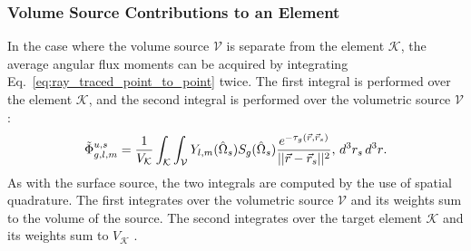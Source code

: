 \subsubsection{Volume Source Contributions to an Element}

In the case where the volume source $\mathcal{V}$ is separate from the element $\mathcal{K}$, the average angular flux moments can be acquired by integrating Eq.~\ref{eq:ray_traced_point_to_point} twice. The first integral is performed over the element $\mathcal{K}$, and the second integral is performed over the volumetric source $\mathcal{V}$:
\begin{equation}\label{eq:volume_to_element_not_same}
    \Tilde{\Phi}_{g,l,m}^{u, s} = \frac{1}{V_{\mathcal{K}}}\int_{\mathcal{K}} \int_{\mathcal{V}} Y_{l,m}(\hat{\Omega}_{s})S_{g}(\hat{\Omega}_{s})\frac{e^{-\tau_{g}(\vec{r}, \vec{r}_{s})}}{||\vec{r} - \vec{r}_{s}||^{2}},\,d^{3}r_{s}\,d^{3}r\text{.}
\end{equation}
As with the surface source, the two integrals are computed by the use of spatial quadrature. The first integrates over the volumetric source $\mathcal{V}$ and its weights sum to the volume of the source. The second integrates over the target element $\mathcal{K}$ and its weights sum to $V_{\mathcal{K}}$ \cite{harbour_uncollided}. 

